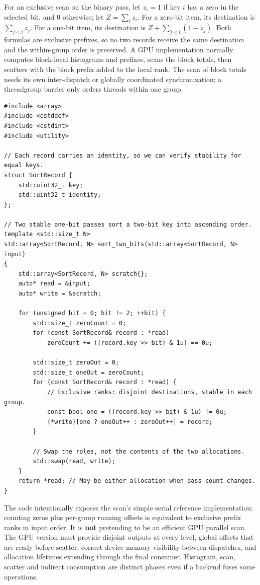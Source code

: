 For an exclusive scan on the binary pass, let \(z_i=1\) if key \(i\) has a zero in the selected bit, and \(0\) otherwise; let \(Z=\sum_i z_i\). For a zero-bit item, its destination is \(\sum_{j<i}z_j\). For a one-bit item, its destination is \(Z+\sum_{j<i}(1-z_j)\). Both formulas are exclusive prefixes, so no two records receive the same destination and the within-group order is preserved. A GPU implementation normally computes block-local histograms and prefixes, scans the block totals, then scatters with the block prefix added to the local rank. The scan of block totals needs its own inter-dispatch or globally coordinated synchronization; a threadgroup barrier only orders threads within one group.

\begin{verbatim}
#include <array>
#include <cstddef>
#include <cstdint>
#include <utility>

// Each record carries an identity, so we can verify stability for equal keys.
struct SortRecord {
    std::uint32_t key;
    std::uint32_t identity;
};

// Two stable one-bit passes sort a two-bit key into ascending order.
template <std::size_t N>
std::array<SortRecord, N> sort_two_bits(std::array<SortRecord, N> input)
{
    std::array<SortRecord, N> scratch{};
    auto* read = &input;
    auto* write = &scratch;

    for (unsigned bit = 0; bit != 2; ++bit) {
        std::size_t zeroCount = 0;
        for (const SortRecord& record : *read)
            zeroCount += ((record.key >> bit) & 1u) == 0u;

        std::size_t zeroOut = 0;
        std::size_t oneOut = zeroCount;
        for (const SortRecord& record : *read) {
            // Exclusive ranks: disjoint destinations, stable in each group.
            const bool one = ((record.key >> bit) & 1u) != 0u;
            (*write)[one ? oneOut++ : zeroOut++] = record;
        }

        // Swap the roles, not the contents of the two allocations.
        std::swap(read, write);
    }
    return *read; // May be either allocation when pass count changes.
}
\end{verbatim}

The code intentionally exposes the scan's simple serial reference implementation: counting zeros plus per-group running offsets is equivalent to exclusive prefix ranks in input order. It is \textbf{not} pretending to be an efficient GPU parallel scan. The GPU version must provide disjoint outputs at every level, global offsets that are ready before scatter, correct device memory visibility between dispatches, and allocation lifetimes extending through the final consumer. Histogram, scan, scatter and indirect consumption are distinct phases even if a backend fuses some operations.

